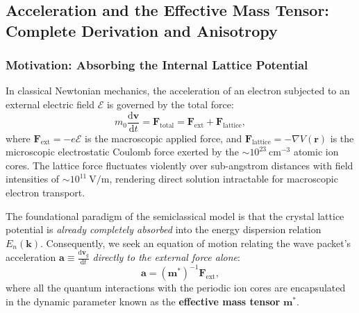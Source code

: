 \documentclass[11pt,a4paper]{article}
\newcommand{\dv}[2]{\frac{\mathrm{d}#1}{\mathrm{d}#2}}
\newcommand{\vb}[1]{\mathbf{#1}}
\newcommand{\kk}{\mathbf{k}}
\newcommand{\rvec}{\mathbf{r}}
\begin{document}
\subsection{Acceleration and the Effective Mass Tensor: Complete Derivation and Anisotropy}

\subsubsection{Motivation: Absorbing the Internal Lattice Potential}
In classical Newtonian mechanics, the acceleration of an electron subjected to an external electric field $\bm{\mathcal{E}}$ is governed by the total force:
\begin{equation}
    m_0 \dv{\vb{v}}{t} = \vb{F}_{\mathrm{total}} = \vb{F}_{\mathrm{ext}} + \vb{F}_{\mathrm{lattice}},
\end{equation}
where $\vb{F}_{\mathrm{ext}} = -e\bm{\mathcal{E}}$ is the macroscopic applied force, and $\vb{F}_{\mathrm{lattice}} = -\nabla V(\rvec)$ is the microscopic electrostatic Coulomb force exerted by the $\sim 10^{23}\ \mathrm{cm^{-3}}$ atomic ion cores. The lattice force fluctuates violently over sub-angstrom distances with field intensities of $\sim 10^{11}\ \mathrm{V/m}$, rendering direct solution intractable for macroscopic electron transport.

The foundational paradigm of the semiclassical model is that the crystal lattice potential is \emph{already completely absorbed} into the energy dispersion relation $E_n(\kk)$. Consequently, we seek an equation of motion relating the wave packet's acceleration $\vb{a} \equiv \dv{\vb{v}_g}{t}$ \emph{directly to the external force alone}:
\begin{equation}
    \vb{a} = (\vb{m}^*)^{-1} \vb{F}_{\mathrm{ext}},
\end{equation}
where all the quantum interactions with the periodic ion cores are encapsulated in the dynamic parameter known as the \textbf{effective mass tensor} $\vb{m}^*$.
\end{document}
